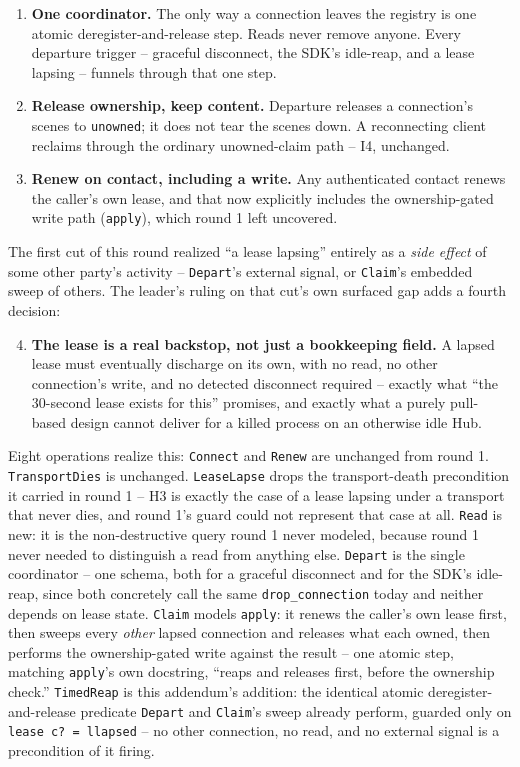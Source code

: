 \documentclass[a4paper,10pt,fleqn]{article}
\begin{document}
\begin{enumerate}
  \item \textbf{One coordinator.} The only way a connection leaves the
    registry is one atomic deregister-and-release step. Reads never
    remove anyone. Every departure trigger -- graceful disconnect, the
    SDK's idle-reap, and a lease lapsing -- funnels through that one step.
  \item \textbf{Release ownership, keep content.} Departure releases a
    connection's scenes to \texttt{unowned}; it does not tear the scenes
    down. A reconnecting client reclaims through the ordinary
    unowned-claim path -- I4, unchanged.
  \item \textbf{Renew on contact, including a write.} Any authenticated
    contact renews the caller's own lease, and that now explicitly
    includes the ownership-gated write path (\texttt{apply}), which round
    1 left uncovered.
\end{enumerate}

The first cut of this round realized ``a lease lapsing'' entirely as a
\emph{side effect} of some other party's activity -- \texttt{Depart}'s
external signal, or \texttt{Claim}'s embedded sweep of others. The leader's
ruling on that cut's own surfaced gap adds a fourth decision:

\begin{enumerate}
  \setcounter{enumi}{3}
  \item \textbf{The lease is a real backstop, not just a bookkeeping
    field.} A lapsed lease must eventually discharge on its own, with no
    read, no other connection's write, and no detected disconnect required
    -- exactly what ``the 30-second lease exists for this'' promises, and
    exactly what a purely pull-based design cannot deliver for a killed
    process on an otherwise idle Hub.
\end{enumerate}

Eight operations realize this: \texttt{Connect} and \texttt{Renew} are
unchanged from round 1. \texttt{TransportDies} is unchanged.
\texttt{LeaseLapse} drops the transport-death precondition it carried in
round 1 -- H3 is exactly the case of a lease lapsing under a transport
that never dies, and round 1's guard could not represent that case at
all. \texttt{Read} is new: it is the non-destructive query round 1 never
modeled, because round 1 never needed to distinguish a read from anything
else. \texttt{Depart} is the single coordinator -- one schema, both for a
graceful disconnect and for the SDK's idle-reap, since both concretely
call the same \texttt{drop\_connection} today and neither depends on
lease state. \texttt{Claim} models \texttt{apply}: it renews the caller's
own lease first, then sweeps every \emph{other} lapsed connection and
releases what each owned, then performs the ownership-gated write against
the result -- one atomic step, matching \texttt{apply}'s own docstring,
``reaps and releases first, before the ownership check.'' \texttt{TimedReap}
is this addendum's addition: the identical atomic deregister-and-release
predicate \texttt{Depart} and \texttt{Claim}'s sweep already perform,
guarded only on \texttt{lease~c? = llapsed} -- no other connection, no read,
and no external signal is a precondition of it firing.
\end{document}
